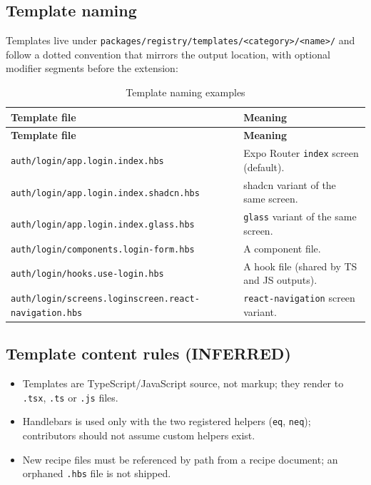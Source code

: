 \subsection*{Template naming}

Templates live under \texttt{packages/registry/templates/<category>/<name>/} and
follow a dotted convention that mirrors the output location, with optional
modifier segments before the extension:

\begin{longtable}{@{}L{6cm}L{8.2cm}@{}}
\caption{Template naming examples}\\
\toprule
\textbf{Template file} & \textbf{Meaning} \\
\midrule
\endfirsthead
\toprule
\textbf{Template file} & \textbf{Meaning} \\
\midrule
\endhead
\texttt{auth/login/app.login.index.hbs} & Expo Router \texttt{index} screen
(default). \\
\texttt{auth/login/app.login.index.shadcn.hbs} & shadcn variant of the same
screen. \\
\texttt{auth/login/app.login.index.glass.hbs} & \texttt{glass} variant of the same
screen. \\
\texttt{auth/login/components.login-form.hbs} & A component file. \\
\texttt{auth/login/hooks.use-login.hbs} & A hook file (shared by TS and JS
outputs). \\
\texttt{auth/login/screens.loginscreen.react-navigation.hbs} &
\texttt{react-navigation} screen variant. \\
\bottomrule
\end{longtable}

\subsection*{Template content rules (INFERRED)}

\begin{itemize}
  \item Templates are TypeScript/JavaScript source, not markup; they render to
        \texttt{.tsx}, \texttt{.ts} or \texttt{.js} files.
  \item Handlebars is used only with the two registered helpers
        (\texttt{eq}, \texttt{neq}); contributors should not assume custom helpers
        exist.
  \item New recipe files must be referenced by path from a recipe document;
        an orphaned \texttt{.hbs} file is not shipped.
\end{itemize}

